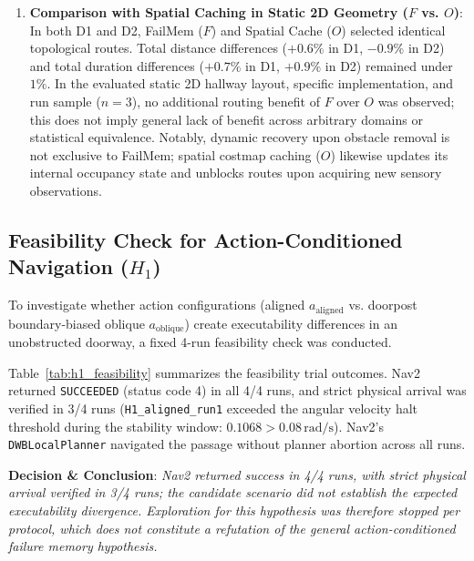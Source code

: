 \begin{enumerate}
    \item \textbf{Comparison with Spatial Caching in Static 2D Geometry ($F$ vs. $O$)}: In both D1 and D2, FailMem ($F$) and Spatial Cache ($O$) selected identical topological routes. Total distance differences ($+0.6\%$ in D1, $-0.9\%$ in D2) and total duration differences ($+0.7\%$ in D1, $+0.9\%$ in D2) remained under $1\%$. In the evaluated static 2D hallway layout, specific implementation, and run sample ($n=3$), no additional routing benefit of $F$ over $O$ was observed; this does not imply general lack of benefit across arbitrary domains or statistical equivalence. Notably, dynamic recovery upon obstacle removal is not exclusive to FailMem; spatial costmap caching ($O$) likewise updates its internal occupancy state and unblocks routes upon acquiring new sensory observations.
\end{enumerate}

\subsection{Feasibility Check for Action-Conditioned Navigation ($H_1$)}
To investigate whether action configurations (aligned $a_{\text{aligned}}$ vs. doorpost boundary-biased oblique $a_{\text{oblique}}$) create executability differences in an unobstructed doorway, a fixed 4-run feasibility check was conducted.



Table~\ref{tab:h1_feasibility} summarizes the feasibility trial outcomes. Nav2 returned \texttt{SUCCEEDED} (status code 4) in all 4/4 runs, and strict physical arrival was verified in 3/4 runs (\texttt{H1\_aligned\_run1} exceeded the angular velocity halt threshold during the stability window: $0.1068 > 0.08\,\text{rad/s}$). Nav2's \texttt{DWBLocalPlanner} navigated the passage without planner abortion across all runs.

\textbf{Decision \& Conclusion}: \emph{Nav2 returned success in 4/4 runs, with strict physical arrival verified in 3/4 runs; the candidate scenario did not establish the expected executability divergence. Exploration for this hypothesis was therefore stopped per protocol, which does not constitute a refutation of the general action-conditioned failure memory hypothesis.}
